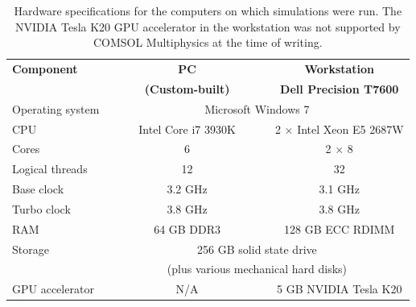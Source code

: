 \begin{table}
	\centering
	\sffamily
	\small
	
	\caption[Computer hardware specifications]{Hardware specifications for the
	computers on which simulations were run. The NVIDIA Tesla K20 GPU accelerator
	in the workstation was not supported by COMSOL Multiphysics at the time of
	writing.}
	\label{table:hardware_specs}
	
    \begin{tabular}{p{3cm} c c}
		\toprule
		\textbf{Component}	& \textbf{PC}				& \textbf{Workstation} \\
							& \textbf{(Custom-built)}	& \textbf{Dell Precision T7600} \\
		\midrule
		
		Operating system				& \multicolumn{2}{c}{Microsoft Windows 7} \\
		CPU								& ~~~~~Intel Core i7 3930K~~~~~	& 2 $ \times $ Intel Xeon E5 2687W \\
		\tableindent Cores				& 6								& 2 $ \times $ 8 \\
		\tableindent Logical threads	& 12							& 32 \\
		\tableindent Base clock			& 3.2 GHz						& 3.1 GHz \\
		\tableindent Turbo clock		& 3.8 GHz						& 3.8 GHz \\
		RAM								& 64 GB DDR3					& 128 GB ECC RDIMM \\
		Storage							& \multicolumn{2}{c}{256 GB solid state drive} \\
										& \multicolumn{2}{c}{(plus various mechanical hard disks)} \\
		GPU accelerator					& N/A							& 5 GB NVIDIA Tesla K20 \\
		\bottomrule
	\end{tabular}
	\bigskip
		
\end{table}




